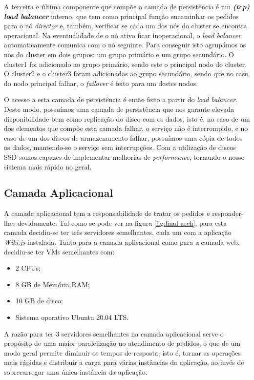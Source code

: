 A terceira e última componente que compõe a camada de persistência é um \textbf{\textit{(tcp) load balancer}} interno, que tem como principal função encaminhar os pedidos para o nó \textit{director} e, também, verificar se cada um dos nós do cluster se encontra operacional. Na eventualidade de o nó ativo ficar inoperacional, o \textit{load balancer} automaticamente comunica com o nó seguinte. Para conseguir isto agrupámos os nós do cluster em dois grupos: um grupo primário e um grupo secundário. O cluster1 foi adicionado ao grupo primário, sendo este o principal nodo do cluster. O cluster2 e o cluster3 foram adicionados ao grupo secundário, sendo que no caso do nodo principal falhar, o \textit{failover} é feito para um destes nodos. 

O acesso a esta camada de persistência é então feito a partir do \textit{load balancer}. Deste modo, possuímos uma camada de persistência que nos garante elevada disponibilidade bem como replicação do disco com os dados, isto é, no caso de um dos elementos que compõe esta camada falhar, o serviço não é interrompido, e no caso de um dos discos de armazenamento falhar, possuímos uma cópia de todos os dados, mantendo-se o serviço sem interrupções. Com a utilização de discos SSD somos capazes de implementar melhorias de \textit{performance}, tornando o nosso sistema mais rápido no geral.


\subsection{Camada Aplicacional}
A camada aplicacional tem a responsabilidade de tratar os pedidos e responder-lhes devidamente. Tal como se pode ver na figura \ref{fig:final-arch}, para esta camada decidiu-se ter três servidores semelhantes, cada um com a aplicação \textit{Wiki.js} instalada. Tanto para a camada aplicacional como para a camada web, decidiu-se ter VMs semelhantes com:

\pagebreak

\begin{itemize}
\item 2 CPUs;
\item 8 GB de Memória RAM;
\item 10 GB de disco;
\item Sistema operativo Ubuntu 20.04 LTS.
\end{itemize}

A razão para ter 3 servidores semelhantes na camada aplicacional serve o propósito de uma maior paralelização no atendimento de pedidos, o que de um modo geral permite diminuir os tempos de resposta, isto é, tornar as operações mais rápidas e distribuir a carga para várias instâncias da aplicação, ao invés de sobrecarregar uma única instância da aplicação.

